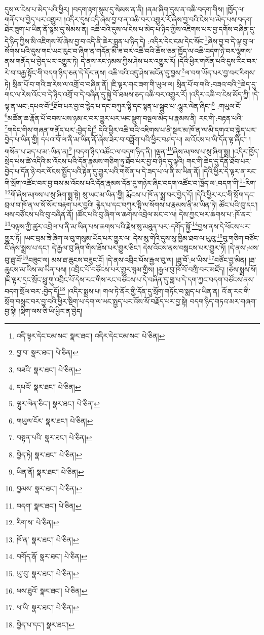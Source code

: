 དུས་ལ་ངེས་པ་མེད་པའི་ཕྱིར། །བདག་རྟག་སྙམ་དུ་སེམས་ན་ནི། །ནམ་ཞིག་དུས་ན་འཆི་བདག་གིས། །ཁྱོད་ལ་གནོད་པ་བྱེད་པར་འགྱུར། །འདིར་དུས་འདི་ཞེས་བྱ་བ་ན་འཆི་བར་འགྱུར་རོ་ཞེས་བྱ་བའི་ངེས་པ་མེད་པས་བདག་ཐེར་ཟུག་པ་ཡིན་ནོ་སྙམ་དུ་སེམས་ན། འཆི་བའི་དུས་ལ་ངེས་པ་མེད་པ་ཉིད་ཀྱིས་འཇིགས་པར་བྱ་དགོས་བཞིན་དུ་དེ་ཉིད་ཀྱིས་མི་འཇིགས་སོ་ཞེས་བྱ་བ་འདི་ནི་ཆེར་བླུན་པ་ཉིད་དེ། :འདིར་དེང་ངམ་དེང་སོང་\footnote{འདི་ལྟར་དེང་ངམ་སང་  སྣར་ཐང་། འདིར་དེང་ངམ་སང་  པེ་ཅིན། }ཞེས་བྱ་བ་དེ་ལྟ་བུ་ལ་སོགས་པའི་དུས་གང་ཡང་རུང་བ་ཞིག་ན་གདོན་མི་ཟ་བར་འཆི་བའི་ཆོས་ཅན་ཁྱོད་ལ་འཆི་བདག་ཉེ་བར་ལྷགས་ནས་གནོད་པ་བྱེད་པར་འགྱུར་ཏེ། དེ་ནས་རང་ཉམས་ཀྱིས་ཤེས་པར་འགྱུར་རོ། །དེའི་ཕྱིར་གསོན་པའི་དུས་རིང་བར་རེ་བ་བརྒྱ་སྟོང་གི་བདག་ཉིད་ཅན་དེ་དོར་ནས། འཆི་བའི་འདུ་ཤེས་མངོན་དུ་བྱས་\footnote{བྱ་བ་  སྣར་ཐང་།  པེ་ཅིན། }ལ་བག་ཡོད་པར་བྱ་བར་རིགས་ཏེ། སྲིན་པོ་བ་གའི་ཟ་རེས་ལ་འགྲོ་བ་བཞིན་ནོ། །ཇི་ལྟར་གང་ཟག་གི་ཡུལ་ལ། སྲིན་པོ་བ་གའི་:བཟའ་བའི་\footnote{བཟའི་  སྣར་ཐང་།  པེ་ཅིན། }ཆེད་དུ་གང་ལ་རེས་འོང་བ་དེ་ཉིད་འགྲོ་བ་དེ་བཞིན་དུ་སྐྱེ་བོ་ཐམས་ཅད་འཆི་བར་འགྱུར་རོ། །འདིར་འཆི་བ་ངེས་མོད་ཀྱི། །དེ་ལྟ་ན་ཡང་:དཔའ་བོ་\footnote{དཔའོ་  སྣར་ཐང་།  པེ་ཅིན། }ཐོབ་པར་བྱ་བ་རྙེད་པ་དང་བཀུར་སྟི་དང་སྙན་པ་སྒྲུབ་པ་:ལྷུར་ལེན་ཞིང་།\footnote{ལྷུར་ལེན་ཅིང་།  སྣར་ཐང་།  པེ་ཅིན། } :གཡུལ་ངོ་\footnote{གཡུལ་ངོར་  སྣར་ཐང་།  པེ་ཅིན། }མཚོན་ཆ་རྣོན་པོ་བབས་པས་ཉམ་ང་བར་གྱུར་པར་ཡང་སྡུག་བསྔལ་མེད་པ་རྣམས་ནི། རང་གི་:བརྟན་པའི་\footnote{བསྟན་པའི་  སྣར་ཐང་།  པེ་ཅིན། }གདེང་གིས་གཞན་གནོད་པར་:བྱེད་དེ།\footnote{བྱེད་ཏེ།  སྣར་ཐང་།  པེ་ཅིན། } དེའི་ཕྱིར་འཆི་བའི་འཇིགས་པ་ནི་སྔར་མ་ཁོ་ན་ལ་མི་དགའ་བ་སྐྱེད་པར་བྱེད་པ་ཡིན་གྱི། དཔའ་བོ་ལ་ནི་མ་ཡིན་ནོ་ཞེས་ཟེར་བ་བཟློག་པའི་ཕྱིར་བཤད་པ། མ་འོངས་པ་ཡི་དོན་ལྟ་ཞིང་། །གསོན་པ་ཟད་པ་མ་:ཡིན་ན།\footnote{ཡིན་ནོ།  སྣར་ཐང་།  པེ་ཅིན། } །བདག་ཉིད་འཚོང་ལ་བདག་ཉིད་ནི། །ལྡན་\footnote{བྱམས་  སྣར་ཐང་།  པེ་ཅིན། }ཞེས་མཁས་པ་སུ་ཞིག་སྨྲ། །འདིར་ཁྱོད་སྲེད་པས་ཚེ་འདིའི་མ་འོངས་པའི་དོན་རྣམས་གཅིག་ཏུ་ཐོབ་པར་བྱ་བ་ཉིད་དུ་ལྟའི། གང་གི་ཆེད་དུ་དོན་ཐོབ་པར་བྱེད་པ་དོན་ཉེ་བར་ལོངས་སྤྱོད་པའི་རྟེན་དུ་གྱུར་པའི་གསོན་པ་དེ་ཟད་པ་ལ་ནི་མ་ཡིན་ནོ། །དེའི་ཕྱིར་དེ་ལྟར་ན་རང་གི་སྲོག་འཚོང་བར་བྱ་བས་མ་འོངས་པའི་དོན་རྣམས་དོན་དུ་གཉེར་ཞིང་བདག་འཚོང་བ་ཁྱོད་ལ་:བདག་གི་\footnote{བདག་  སྣར་ཐང་།  པེ་ཅིན། }རིག་\footnote{རིག་ས་  པེ་ཅིན། }གོ་ཞེས་མཁས་པ་སུ་ཞིག་སྨྲ་སྟེ། སུ་ཡང་མ་ཡིན་གྱི། རྨོངས་པ་ཁོ་ན་སྨྲ་བར་བྱེད་དོ། །དེའི་ཕྱིར་རང་གི་སྲོག་དང་བྲལ་བ་ཁོ་ན་ལ་སོ་སོར་བརྟག་པར་བྱའི། རྙེད་པ་དང་བཀུར་སྟི་ལ་སོགས་པ་རྣམས་ནི་མ་ཡིན་ཏེ། ཚོང་པའི་བུ་དང་། ཕས་བཙོངས་པའི་བུ་བཞིན་ནོ། །ཚོང་པའི་བུ་ཞིག་ལ་ཆགས་འབྲེལ་མང་བ་ལ། དེས་ཀྱང་ཕར་ཆགས་པ་:ཁོ་ནར་\footnote{ཁོ་ན་  སྣར་ཐང་།  པེ་ཅིན། }བལྟས་ཀྱི་ཚུར་འབྲེལ་པ་ནི་མ་ཡིན་པས་ཆགས་པའི་རྗེས་སུ་མཐུན་པར་:དགོད་སྐྱོ་\footnote{བགོད་རྒོ་  སྣར་ཐང་།  པེ་ཅིན། }བྱས་ནས་དེ་ཕོངས་པར་གྱུར་ཏོ། །ཡང་བྲམ་ཟེ་ཞིག་ལ་བུ་གསུམ་ཡོད་པར་གྱུར་ལ། དེས་མུ་གེའི་དུས་སུ་ཁྱིམ་ཐབ་ལ་ཡུའུ་\footnote{ཡུ་བུ་  སྣར་ཐང་།  པེ་ཅིན། }བུ་གཅིག་བཙོང་ངོ་ཞེས་སྨྲས་པ་དང་། དེ་རྒྱལ་བུ་ཞིག་གིས་ཐོས་པར་གྱུར་ཅིང་། དེས་འོངས་ནས་བསླངས་པར་གྱུར་ཏོ། །དེ་ནས་:ཕས་བུ་ཐུ་བོ་\footnote{ཕས་ཐུའོ་  སྣར་ཐང་།  པེ་ཅིན། }བཟུང་ལ། མས་ཐ་ཆུངས་བཟུང་ངོ། །དེ་ནས་འབྲིང་པོས་རྒྱལ་བུ་ལ། །ཐུ་བོ་:ཕ་ཡིས་\footnote{ཕ་ཡི་  སྣར་ཐང་།  པེ་ཅིན། }བཙོང་བྱ་མིན། །ཐ་ཆུངས་མ་ཡིས་མ་ཡིན་པས། །འབྲིང་པོ་བཙོངས་པར་གྱུར་སྙམ་གྱིས། །རྒྱལ་བུ་ཁོ་བོ་བཀྲི་བར་མཛོད། །ཅེས་སྨྲས་སོ། །ཇི་ལྟར་དྲང་སྲོང་ཕྲུ་གུ་འབྲིང་པོ་དེས་རང་གིས་རང་བཙོངས་པ་དེ་བཞིན་དུ་གླ་པ་དེ་དག་ཀྱང་བདག་བཙོངས་ནས་བདག་སྲོལ་བར་:བྱེད་དོ།\footnote{བྱེད་པ་དང་།  སྣར་ཐང་། } །འདིར་སྨྲས་པ། གལ་ཏེ་ནོར་གྱི་དོན་དུ་སྲོག་གཏོང་བ་སྨད་པ་ཡིན་ན། འོ་ན་རང་གི་སྲོག་བསྲུང་བར་བྱ་བའི་ཕྱིར་སྡིག་པ་དག་ལ་ཡང་སྤྱད་པར་འོས་སོ་བརྗོད་པར་བྱ་སྟེ། བདག་ཉིད་གཏའ་མར་གཞག་བྱ་སྟེ། །སྡིག་ལས་ཅི་ཡི་ཕྱིར་ན་བྱེད། 